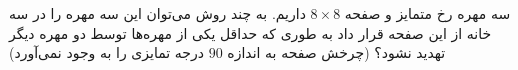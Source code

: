 \EXERCISE
	سه مهره رخ متمایز و صفحه $8\times 8$ 
	داریم. به چند روش می‌توان این سه مهره را در سه خانه از این صفحه قرار داد به طوری که حداقل یکی از مهره‌ها توسط دو مهره دیگر تهدید نشود؟ (چرخش صفحه به اندازه $90$ درجه تمایزی را به وجود نمی‌آورد)
